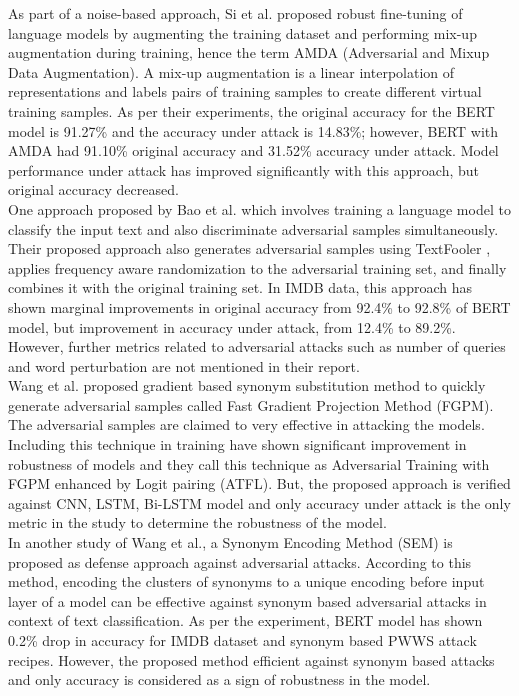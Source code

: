 \documentclass[%
	BCOR=8mm, %
	DIV=12,
	toc=bibliography, %
	toc=listof, %
	oneside, %
	egregdoesnotlikesansseriftitles, %
	]{scrbook}
\begin{document}
As part of a noise-based approach, Si et al.\cite{si_better_2021}  proposed robust fine-tuning of language models by augmenting the training dataset and performing mix-up augmentation during training, hence the term AMDA (Adversarial and Mixup Data Augmentation). A mix-up augmentation is a linear interpolation of representations and labels pairs of training samples to create different virtual training samples. As per their experiments, the original accuracy for the BERT model is 91.27\% and the accuracy under attack is 14.83\%; however, BERT with AMDA had 91.10\% original accuracy and 31.52\% accuracy under attack. Model performance under attack has improved significantly with this approach, but original accuracy decreased.\\
One approach proposed by Bao et al.\cite{bao_defending_2021} which involves training a language model to classify the input text and also discriminate adversarial samples simultaneously. Their proposed approach also generates adversarial samples using TextFooler \cite{jin_is_2020}, applies frequency aware randomization to the adversarial training set, and finally combines it with the original training set. In IMDB data, this approach has shown marginal improvements in original accuracy from 92.4\% to 92.8\% of BERT model, but improvement in accuracy under attack, from 12.4\% to 89.2\%. However, further metrics related to adversarial attacks such as number of queries and word perturbation are not mentioned in their report.\\
Wang et al.\cite{wang_adversarial_2021-1} proposed gradient based synonym substitution method to quickly generate adversarial samples called Fast Gradient Projection Method (FGPM). The adversarial samples are claimed to very effective in attacking the models. Including this technique in training have shown significant improvement in robustness of models and they call this technique as Adversarial Training with FGPM enhanced by Logit pairing (ATFL). But, the proposed approach is verified against CNN, LSTM, Bi-LSTM model and only accuracy under attack is the only metric in the study to determine the robustness of the model.\\
In another study of Wang et al.\cite{wang_natural_2020-1}, a Synonym Encoding Method (SEM) is proposed as defense approach against adversarial attacks. According to this method,  encoding the clusters of synonyms to a unique encoding before input layer of a model can be effective against synonym based adversarial attacks in context of text classification. As per the experiment, BERT model has shown 0.2\% drop in accuracy for IMDB dataset and synonym based PWWS attack recipes. However, the proposed method efficient against synonym based attacks and only accuracy is considered as a sign of robustness in the model.\\
\end{document}
